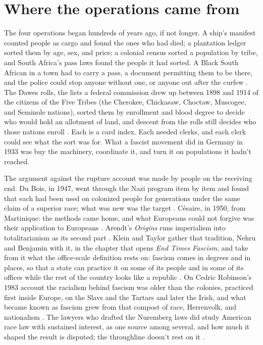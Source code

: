 \section{Where the operations came from}
\label{sec:3.1}
The four operations began hundreds of years ago, if not longer. A ship's manifest counted people as cargo and found the ones who had died; a plantation ledger sorted them by age, sex, and price; a colonial census sorted a population by tribe, and South Africa's pass laws found the people it had sorted. A Black South African in a town had to carry a pass, a document permitting them to be there, and the police could stop anyone without one, or anyone out after the curfew \autocites[256, 260]{popke2003colonial}{dubruyn2023curfew}. The Dawes rolls, the lists a federal commission drew up between 1898 and 1914 of the citizens of the Five Tribes (the Cherokee, Chickasaw, Choctaw, Muscogee, and Seminole nations), sorted them by enrollment and blood degree to decide who would hold an allotment of land, and descent from the rolls still decides who those nations enroll \autocite{nara2026dawes}. Each is a card index. Each needed clerks, and each clerk could see what the sort was for. What a fascist movement did in Germany in 1933 was buy the machinery, coordinate it, and turn it on populations it hadn't reached.

The argument against the rupture account was made by people on the receiving end. Du Bois, in 1947, went through the Nazi program item by item and found that each had been used on colonized people for generations under the same claim of a superior race; what was new was the target \autocite[23]{dubois1947world}. Césaire, in 1950, from Martinique: the methods came home, and what Europeans could not forgive was their application to Europeans \autocite[36]{cesaire2000discourse}. Arendt's \emph{Origins} runs imperialism into totalitarianism as its second part \autocite[pt.~2]{arendt1951origins}. Klein and Taylor gather that tradition, Nehru and Benjamin with it, in the chapter that opens \emph{End Times Fascism}, and take from it what the office-scale definition rests on: fascism comes in degrees and in places, so that a state can practice it on some of its people and in some of its offices while the rest of the country looks like a republic \autocite{KleinTaylor2026}. On Cedric Robinson's 1983 account the racialism behind fascism was older than the colonies, practiced first inside Europe, on the Slavs and the Tartars and later the Irish, and what became known as fascism grew from that compost of race, Herrenvolk, and nationalism \autocite[26–27]{robinson2000black}. The lawyers who drafted the Nuremberg laws did study American race law with sustained interest, as one source among several, and how much it shaped the result is disputed; the throughline doesn't rest on it \autocite{whitman2017hitler}.

